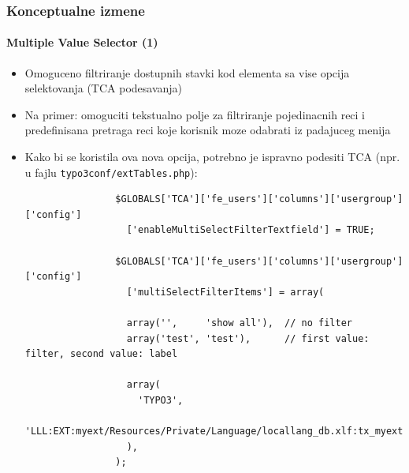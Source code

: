 \begin{frame}[fragile]
	\frametitle{Konceptualne izmene}
	\framesubtitle{Multiple Value Selector (1)}

	\lstset{
		basicstyle=\tiny\ttfamily
	}

	\begin{itemize}
		\item Omoguceno filtriranje dostupnih stavki kod elementa sa vise opcija selektovanja (TCA podesavanja)
		\item Na primer: omoguciti tekstualno polje za filtriranje pojedinacnih reci i predefinisana pretraga reci koje korisnik moze odabrati iz padajuceg menija

		\item Kako bi se koristila ova nova opcija, potrebno je ispravno podesiti TCA\newline
			(npr. u fajlu \texttt{typo3conf/extTables.php}):


			\begin{lstlisting}
				$GLOBALS['TCA']['fe_users']['columns']['usergroup']['config']
				  ['enableMultiSelectFilterTextfield'] = TRUE;

				$GLOBALS['TCA']['fe_users']['columns']['usergroup']['config']
				  ['multiSelectFilterItems'] = array(

				  array('',     'show all'),  // no filter
				  array('test', 'test'),      // first value: filter, second value: label

				  array(
				    'TYPO3',
				    'LLL:EXT:myext/Resources/Private/Language/locallang_db.xlf:tx_myext.label.typo3'
				  ),
				);
			\end{lstlisting}

	\end{itemize}

\end{frame}


